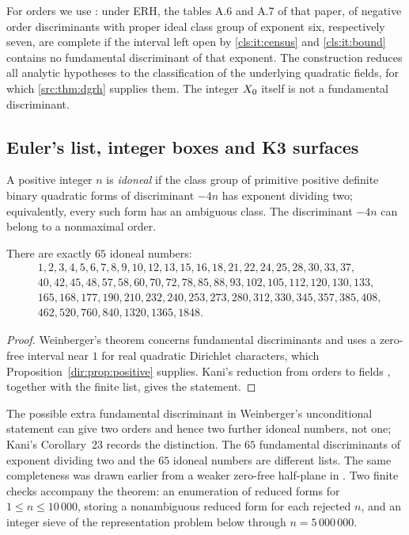 For orders we use \cite[Theorem~1.3(5),(6) and Section~6]{Aiken2026Boundary}: under ERH,
the tables A.6 and A.7 of that paper, of negative order discriminants with proper ideal
class group of exponent six, respectively seven, are complete if the interval left open
by \ref{cls:it:census} and \ref{cls:it:bound} contains no fundamental discriminant of that
exponent. The construction reduces all analytic hypotheses to the classification of the
underlying quadratic fields, for which \cref{src:thm:dgrh} supplies them. The integer
$X_0$ itself is not a fundamental discriminant.

\subsection{Euler's list, integer boxes and K3 surfaces}\label{dir:sec:idoneal}

A positive integer $n$ is \emph{idoneal} if the class group of primitive positive
definite binary quadratic forms of discriminant $-4n$ has exponent dividing two;
equivalently, every such form has an ambiguous class. The discriminant $-4n$ can belong
to a nonmaximal order.

\begin{theorem}\label{dir:thm:idoneal}
There are exactly $65$ idoneal numbers:
\begin{align*}
&1,2,3,4,5,6,7,8,9,10,12,13,15,16,18,21,22,24,25,28,30,33,37,\\
&40,42,45,48,57,58,60,70,72,78,85,88,93,102,105,112,120,130,133,\\
&165,168,177,190,210,232,240,253,273,280,312,330,345,357,385,408,\\
&462,520,760,840,1320,1365,1848.
\end{align*}
\end{theorem}

\begin{proof}
Weinberger's theorem \cite{Weinberger1973Exponents} concerns fundamental discriminants
and uses a zero-free interval near $1$ for real quadratic Dirichlet characters, which
Proposition~\ref{dir:prop:positive} supplies. Kani's reduction from orders to fields
\cite[Theorems~6 and~22, Corollary~23]{Kani2011Idoneal}, together with the finite list,
gives the statement.
\end{proof}

The possible extra fundamental discriminant in Weinberger's unconditional statement can
give two orders and hence two further idoneal numbers, not one; Kani's Corollary~23
records the distinction. The $65$ fundamental discriminants of exponent dividing two and
the $65$ idoneal numbers are different lists. The same completeness was drawn earlier
from a weaker zero-free half-plane in \cite{OpenAI2026Quasi}. Two finite checks
accompany the theorem: an enumeration of reduced forms for $1\le n\le10\,000$, storing a
nonambiguous reduced form for each rejected $n$, and an integer sieve of the
representation problem below through $n=5\,000\,000$.

